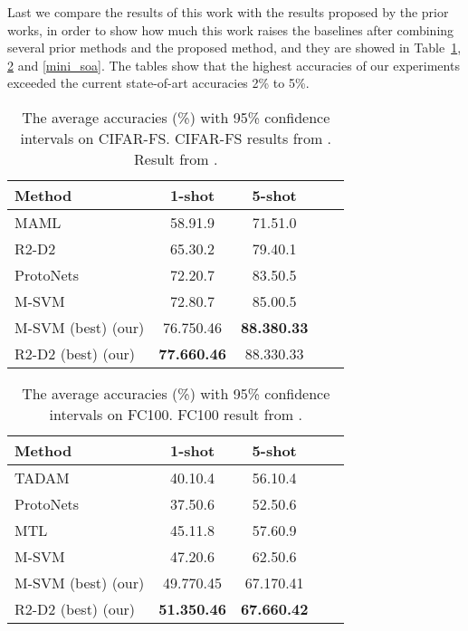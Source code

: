 \documentclass[10pt,twocolumn,letterpaper]{article}
\begin{document}
Last we compare the results of this work with the results proposed by the prior works, in order to show how much this work raises the baselines after combining several prior methods and the proposed method, and they are showed in Table~\ref{CIFAR-FS_soa}, \ref{FC100_soa} and \ref{mini_soa}. The tables show that the highest accuracies of our experiments exceeded the current state-of-art accuracies 2\% to 5\%.

\begin{table}[t]
\caption{The average accuracies (\%) with 95\% confidence intervals on CIFAR-FS. CIFAR-FS results from \cite{bertinetto2018meta}. Result from \cite{lee2019meta}.}
\label{CIFAR-FS_soa}
\begin{center}
\begin{tabular}{lcccc}
\toprule[1pt]
\textbf{Method} & \textbf{1-shot} & \textbf{5-shot} \\
\hline
MAML~\cite{finn2017model} & 58.91.9 & 71.51.0\\
R2-D2~\cite{bertinetto2018meta} & 65.30.2 & 79.40.1\\
ProtoNets~\cite{snell2017prototypical} & 72.20.7 & 83.50.5\\
M-SVM~\cite{lee2019meta} & 72.80.7 & 85.00.5\\
\hline
M-SVM (best) (our) & 76.750.46 & \textbf{88.380.33}\\
R2-D2 (best) (our) & \textbf{77.660.46} & 88.330.33\\
\bottomrule[1pt]
\end{tabular}
\end{center}
\end{table}


\begin{table}[t]
\caption{The average accuracies (\%) with 95\% confidence intervals on FC100. FC100 result from \cite{lee2019meta}.}
\label{FC100_soa}
\begin{center}
\begin{tabular}{lcccc}
\toprule[1pt]
\textbf{Method} & \textbf{1-shot} & \textbf{5-shot} \\
\hline
TADAM~\cite{oreshkin2018tadam} & 40.10.4 & 56.10.4\\
ProtoNets~\cite{snell2017prototypical} & 37.50.6 & 52.50.6\\
MTL~\cite{sun2019meta} & 45.11.8 & 57.60.9\\
M-SVM~\cite{lee2019meta} & 47.20.6 & 62.50.6\\
\hline
M-SVM (best) (our) & 49.770.45 & 67.170.41\\
R2-D2 (best) (our) & \textbf{51.350.46} & \textbf{67.660.42}\\
\bottomrule[1pt]
\end{tabular}
\end{center}
\end{table}
\end{document}
